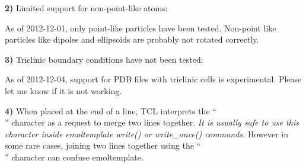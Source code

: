 \documentclass[11pt]{article}
\begin{document}
\textbf{2)} Limited support for non-point-like atoms:

As of 2012-12-01, only point-like particles have been tested.
Non-point like particles like dipoles and ellipsoids are probably 
not rotated correctly.

\textbf{3)} Triclinic boundary conditions have not been tested:

As of 2012-12-04, support for PDB files with triclinic cells is experimental.
Please let me know if it is not working.

\textbf{4)} 
When placed at the end of a line, TCL interprets the ``\\'' character
as a request to merge two lines together.
\textit{It is usually safe to use this character inside
emoltemplate write() or write\_once() commands.}
However in some rare cases, joining two lines together using 
the ``\\'' character can confuse emoltemplate. 

\end{document}
